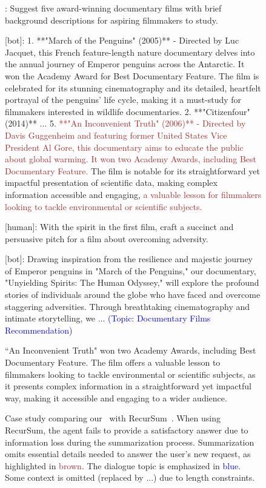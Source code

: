 \begin{figure}[htbp]
\small
\begin{tcolorbox}[left=3pt,right=3pt,top=3pt,bottom=3pt,title=\textbf{Retrieved Memory (Ours):}]
[human]: Suggest five award-winning documentary films with brief background descriptions for aspiring filmmakers to study.

[bot]: 1. **"March of the Penguins" (2005)** - Directed by Luc Jacquet, this French feature-length nature documentary delves into the annual journey of Emperor penguins across the Antarctic. It won the Academy Award for Best Documentary Feature. The film is celebrated for its stunning cinematography and its detailed, heartfelt portrayal of the penguins' life cycle, making it a must-study for filmmakers interested in wildlife documentaries. 2. **"Citizenfour" (2014)** ... 5. \textcolor{brown}{**"An Inconvenient Truth" (2006)** - Directed by Davis Guggenheim and featuring former United States Vice President Al Gore, this documentary aims to educate the public about global warming. It won two Academy Awards, including Best Documentary Feature.} The film is notable for its straightforward yet impactful presentation of scientific data, making complex information accessible and engaging, \textcolor{brown}{a valuable lesson for filmmakers looking to tackle environmental or scientific subjects.}

[human]: With the spirit in the first film, craft a succinct and persuasive pitch for a film about overcoming adversity.

[bot]: Drawing inspiration from the resilience and majestic journey of Emperor penguins in "March of the Penguins," our documentary, "Unyielding Spirits: The Human Odyssey," will explore the profound stories of individuals around the globe who have faced and overcome staggering adversities. Through breathtaking cinematography and intimate storytelling, we ...
\textcolor{blue}{(Topic: Documentary Films Recommendation)}
\end{tcolorbox}
\begin{tcolorbox}[left=3pt,right=3pt,top=3pt,bottom=3pt,title=\textbf{Answer (Ours):}]
``An Inconvenient Truth" won two Academy Awards, including Best Documentary Feature. The film offers a valuable lesson to filmmakers looking to tackle environmental or scientific subjects, as it presents complex information in a straightforward yet impactful way, making it accessible and engaging to a wider audience.


\end{tcolorbox}
\caption{Case study comparing our \sysname\ with RecurSum~\citep{wang2023recursively}. When using RecurSum, the agent fails to provide a satisfactory answer due to information loss during the summarization process. Summarization omits essential details needed to answer the user's new request, as highlighted in \textcolor{brown}{brown}. The dialogue topic is emphasized in \textcolor{blue}{blue}. Some context is omitted (replaced by ...) due to length constraints.}
\label{fig: case_study_segment_vs_rsum}
\end{figure}




